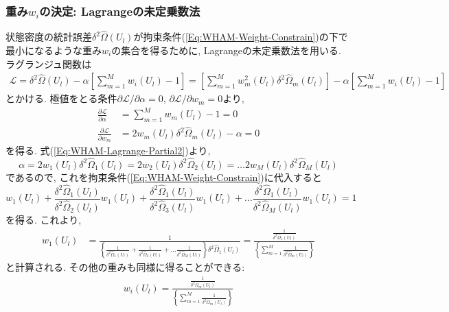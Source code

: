 \subsubsection{重み$w_{i}$の決定: Lagrangeの未定乗数法}
状態密度の統計誤差$\delta^{2}\hat{\Omega}(U_{l})$が拘束条件(\ref{Eq:WHAM-Weight-Constrain})の下で最小になるような重み$w_{i}$の集合を得るために, Lagrangeの未定乗数法を用いる. ラグランジュ関数は
\begin{align}
    \mathcal{L} =
    \delta^{2}\hat{\Omega}(U_{l}) -
    \alpha \left[\sum_{m=1}^{M}w_{i}(U_{l}) - 1\right] =
    \left[\sum_{m=1}^{M} w_{m}^{2}(U_{l}) \delta^{2}\hat{\Omega}_{m}(U_{l}) \right] -
    \alpha \left[\sum_{m=1}^{M}w_{i}(U_{l}) - 1\right]
\end{align}
とかける. 
極値をとる条件$\partial \mathcal{L}/\partial \alpha = 0$, $\partial \mathcal{L}/\partial w_{m} = 0$より, 
\begin{align}
    \frac{\partial \mathcal{L}}{\partial \alpha} &=
    \sum_{m=1}^{M} w_{m}(U_{l}) - 1 = 0
    \\
    \frac{\partial \mathcal{L}}{\partial w_{m}} &=
    2 w_{m}(U_{l}) \delta^{2} \hat{\Omega}_{m}(U_{l}) - \alpha = 0
    \label{Eq:WHAM-Lagrange-Partial2}
\end{align}
を得る. 式(\ref{Eq:WHAM-Lagrange-Partial2})より, 
\begin{equation}
    \alpha =
    2 w_{1} (U_{l}) \delta^{2} \hat{\Omega}_{1} (U_{l}) =
    2 w_{2} (U_{l}) \delta^{2} \hat{\Omega}_{2} (U_{l}) =
    \ldots
    2 w_{M} (U_{l}) \delta^{2} \hat{\Omega}_{M} (U_{l})
\end{equation}
であるので, これを拘束条件(\ref{Eq:WHAM-Weight-Constrain})に代入すると
\begin{equation}
    w_{1}(U_{l}) +
    \frac{\delta^{2} \hat{\Omega}_{1}(U_{l})}{\delta^{2} \hat{\Omega}_{2}(U_{l})} w_{1}(U_{l}) +
    \frac{\delta^{2} \hat{\Omega}_{1}(U_{l})}{\delta^{2} \hat{\Omega}_{3}(U_{l})} w_{1}(U_{l}) +
    \ldots
    \frac{\delta^{2} \hat{\Omega}_{1}(U_{l})}{\delta^{2} \hat{\Omega}_{M}(U_{l})} w_{1}(U_{l}) =
    1
\end{equation}
を得る. これより, 
\begin{align}
    w_{1}(U_{l}) &=
    \frac
    {1}
    {\left\{
        \frac{1}{\delta^{2}\hat{\Omega}_{1}(U_{l})} +
        \frac{1}{\delta^{2}\hat{\Omega}_{2}(U_{l})} +
        \ldots
        \frac{1}{\delta^{2}\hat{\Omega}_{M}(U_{l})}
    \right\} \delta^{2}\hat{\Omega}_{1}(U_{l})
    }
    =
    \frac
    {\frac{1}{\delta^{2}\hat{\Omega}_{1}(U_{l})}}
    {\left\{\sum_{m=1}^{M} \frac{1}{\delta^{2}\hat{\Omega}_{m}(U_{l})}\right\}}
\end{align}
と計算される. 
その他の重みも同様に得ることができる:
\begin{align}
    w_{i}(U_{l}) =
    \frac
    {\frac{1}{\delta^{2}\hat{\Omega}_{m}(U_{l})}}
    {\left\{\sum_{m=1}^{M} \frac{1}{\delta^{2}\hat{\Omega}_{m}(U_{l})}\right\}}
    \label{Eq:WHAM-Weight}
\end{align}

